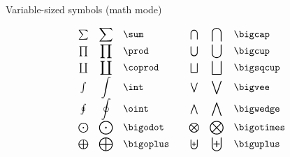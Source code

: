 \begin{table}
\caption{Variable-sized symbols (math mode)}
\begin{center}
\begin{displaymath}
\begin{array}{ccl@{\hspace{2em}}ccl}
\sum & \displaystyle \sum & \hbox{\verb"\sum"} &
	\bigcap & \displaystyle \bigcap & \hbox{\verb"\bigcap"} \\[.7ex]
\prod & \displaystyle \prod & \hbox{\verb"\prod"} &
	\bigcup & \displaystyle \bigcup & \hbox{\verb"\bigcup"} \\[.7ex]
\coprod & \displaystyle \coprod & \hbox{\verb"\coprod"} &
	\bigsqcup & \displaystyle \bigsqcup & \hbox{\verb"\bigsqcup"} \\[.7ex]
\int & \displaystyle \int & \hbox{\verb"\int"} &
	\bigvee & \displaystyle \bigvee & \hbox{\verb"\bigvee"} \\[.7ex]
\oint & \displaystyle \oint & \hbox{\verb"\oint"} &
	\bigwedge & \displaystyle \bigwedge & \hbox{\verb"\bigwedge"} \\[.7ex]
\bigodot & \displaystyle \bigodot & \hbox{\verb"\bigodot"} &
	\bigotimes & \displaystyle \bigotimes & \hbox{\verb"\bigotimes"} \\[.7ex]
\bigoplus & \displaystyle \bigoplus & \hbox{\verb"\bigoplus"} &
	\biguplus & \displaystyle \biguplus & \hbox{\verb"\biguplus"} \\
\end{array}
\end{displaymath}
\end{center}
\end{table}

